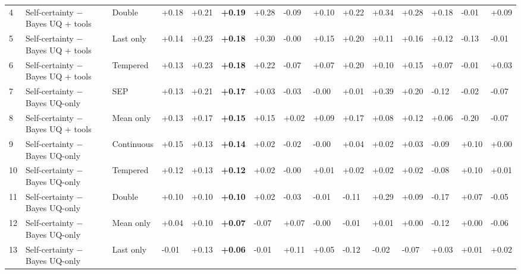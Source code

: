 \documentclass[10pt,a4paper]{article}
\begin{document}
\begin{longtable}{@{}R{8.000mm}L{38.000mm}L{30.000mm}C{14.000mm}C{14.000mm}C{14.000mm}C{14.000mm}C{14.000mm}C{14.000mm}C{14.000mm}C{14.000mm}C{14.000mm}C{14.000mm}C{14.000mm}C{14.000mm}@{}}
4 & Self-certainty \ensuremath{-} Bayes UQ + tools & Double & +0.18 & +0.21 & \textbf{+0.19} & +0.28 & -0.09 & +0.10 & +0.22 & +0.34 & +0.28 & +0.18 & -0.01 & +0.09 \\
5 & Self-certainty \ensuremath{-} Bayes UQ + tools & Last only & +0.14 & +0.23 & \textbf{+0.18} & +0.30 & -0.00 & +0.15 & +0.20 & +0.11 & +0.16 & +0.12 & -0.13 & -0.01 \\
6 & Self-certainty \ensuremath{-} Bayes UQ + tools & Tempered & +0.13 & +0.23 & \textbf{+0.18} & +0.22 & -0.07 & +0.07 & +0.20 & +0.10 & +0.15 & +0.07 & -0.01 & +0.03 \\
7 & Self-certainty \ensuremath{-} Bayes UQ-only & SEP & +0.13 & +0.21 & \textbf{+0.17} & +0.03 & -0.03 & -0.00 & +0.01 & +0.39 & +0.20 & -0.12 & -0.02 & -0.07 \\
8 & Self-certainty \ensuremath{-} Bayes UQ + tools & Mean only & +0.13 & +0.17 & \textbf{+0.15} & +0.15 & +0.02 & +0.09 & +0.17 & +0.08 & +0.12 & +0.06 & -0.20 & -0.07 \\
9 & Self-certainty \ensuremath{-} Bayes UQ-only & Continuous & +0.15 & +0.13 & \textbf{+0.14} & +0.02 & -0.02 & -0.00 & +0.04 & +0.02 & +0.03 & -0.09 & +0.10 & +0.00 \\
10 & Self-certainty \ensuremath{-} Bayes UQ-only & Tempered & +0.12 & +0.13 & \textbf{+0.12} & +0.02 & -0.00 & +0.01 & +0.02 & +0.02 & +0.02 & -0.08 & +0.10 & +0.01 \\
11 & Self-certainty \ensuremath{-} Bayes UQ-only & Double & +0.10 & +0.10 & \textbf{+0.10} & +0.02 & -0.03 & -0.01 & -0.11 & +0.29 & +0.09 & -0.17 & +0.07 & -0.05 \\
12 & Self-certainty \ensuremath{-} Bayes UQ-only & Mean only & +0.04 & +0.10 & \textbf{+0.07} & -0.07 & +0.07 & -0.00 & -0.01 & +0.01 & +0.00 & -0.12 & +0.00 & -0.06 \\
13 & Self-certainty \ensuremath{-} Bayes UQ-only & Last only & -0.01 & +0.13 & \textbf{+0.06} & -0.01 & +0.11 & +0.05 & -0.12 & -0.02 & -0.07 & +0.03 & +0.01 & +0.02 \\
\end{longtable}
\endgroup
\Needspace{40mm}
\Needspace{40mm}
\end{document}
